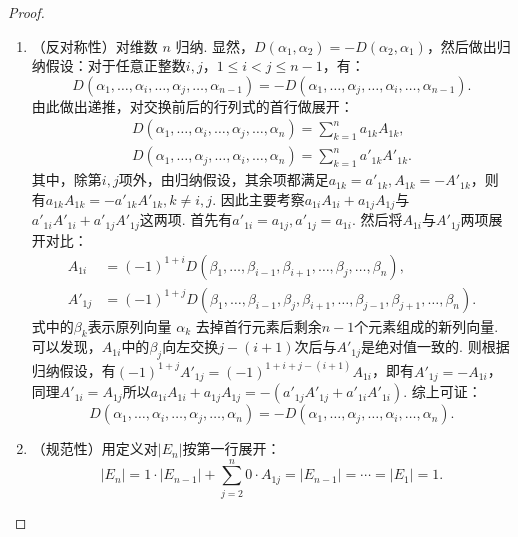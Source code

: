 \begin{proof}
\begin{enumerate}
\begin{enumerate}
                \item （反对称性）对维数 $n$ 归纳. 显然，$D(\alpha_1,\alpha_2)=-D(\alpha_2,\alpha_1)$，然后做出归纳假设：对于任意正整数$i,j$，$1 \leqslant i < j \leqslant n - 1$，有：
                    \[ D(\alpha_1,\ldots,\alpha_i,\ldots,\alpha_j,\ldots,\alpha_{n-1})=-D(\alpha_1,\ldots,\alpha_j,\ldots,\alpha_i,\ldots,\alpha_{n-1}). \]
                    由此做出递推，对交换前后的行列式的首行做展开：
                    \begin{gather*}
                        D(\alpha_1,\ldots,\alpha_{i},\ldots,\alpha_{j},\ldots,\alpha_n)
                         =\sum_{k=1}^{n}a_{1k}A_{1k},   \\
                        D(\alpha_1,\ldots,\alpha_{j},\ldots,\alpha_{i},\ldots,\alpha_n)
                         =\sum_{k=1}^{n}a'_{1k}A'_{1k}.
                    \end{gather*}
                    其中，除第$i,j$项外，由归纳假设，其余项都满足$a_{1k}=a'_{1k},A_{1k}=-A'_{1k}$，则有$a_{1k}A_{1k}=-a'_{1k}A'_{1k},k\neq i,j$. 因此主要考察$a_{1i}A_{1i}+a_{1j}A_{1j}$与$a'_{1i}A'_{1i}+a'_{1j}A'_{1j}$这两项. 首先有$a'_{1i}=a_{1j},a'_{1j}=a_{1i}$. 然后将$A_{1i}$与$A'_{1j}$两项展开对比：
                    \begin{align*}
                        A_{1i}  & =(-1)^{1+i} D(\beta_{1},\ldots,\beta_{i-1},\beta_{i+1},\ldots,\beta_{j},\ldots,\beta_{n}),                             \\
                        A'_{1j} & =(-1)^{1+j} D(\beta_{1},\ldots,\beta_{i-1},\beta_{j},\beta_{i+1},\ldots,\beta_{j-1},\beta_{j+1},\ldots,\beta_{n}).
                    \end{align*}
                    式中的$\beta_k$表示原列向量 $\alpha_k$ 去掉首行元素后剩余$n-1$个元素组成的新列向量. 可以发现，$A_{1i}$中的$\beta_j$向左交换$j-(i+1)$次后与$A'_{1j}$是绝对值一致的. 则根据归纳假设，有$(-1)^{1+j}A'_{1j}=(-1)^{1+i+j-(i+1)}A_{1i}$，即有$A'_{1j}=-A_{1i}$，同理$A'_{1i}=A_{1j}$所以$a_{1i}A_{1i}+a_{1j}A_{1j}=-(a'_{1j}A'_{1j}+a'_{1i}A'_{1i})$. 综上可证：
                    \[ D(\alpha_1,\ldots,\alpha_{i},\ldots,\alpha_{j},\ldots,\alpha_n)=-D(\alpha_1,\ldots,\alpha_{j},\ldots,\alpha_{i},\ldots,\alpha_n). \]

                \item （规范性）用定义对$|E_n|$按第一行展开：
                \[|E_n|=1\cdot |E_{n-1}|+\sum\limits_{j=2}^{n}0\cdot A_{1j}=|E_{n-1}|=\cdots=|E_1|=1.\]
            \end{enumerate}
    \end{enumerate}
\end{proof}



